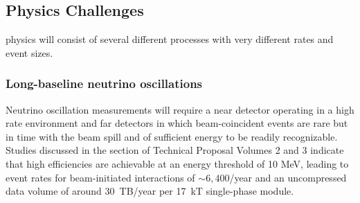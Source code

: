 %



\subsection{Physics Challenges}

  physics will consist of several different processes with very different rates and event sizes. 


\subsubsection{Long-baseline neutrino oscillations} Neutrino oscillation measurements will require a near detector operating in a high rate environment and far detectors in which beam-coincident events are rare but in time with the beam spill and of sufficient energy to be readily recognizable.  Studies discussed in the  section of  Technical Proposal Volumes 2 and 3 indicate that high efficiencies are achievable at an energy threshold of 10 MeV, leading to event rates for beam-initiated  interactions of $\sim 6,400$/year and an uncompressed data volume of around 30~TB/year per 17~kT single-phase module. 


